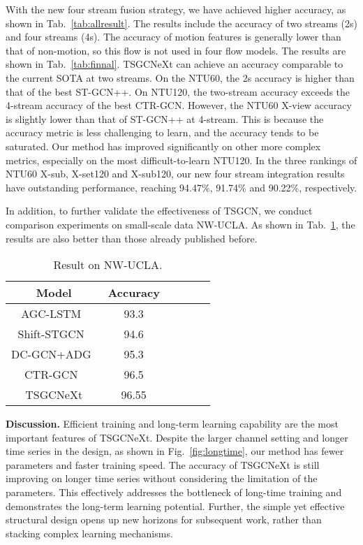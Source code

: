 \documentclass[10pt,twocolumn,letterpaper]{article}
\begin{document}
With the new four stream fusion strategy, we have achieved higher accuracy, as shown in Tab.~\ref{tab:allresult}. The results include the accuracy of two streams (2s) and four streams (4s). The accuracy of motion features is generally lower than that of non-motion, so this flow is not used in four flow models. The results are shown in Tab.~\ref{tab:finnal}. TSGCNeXt can achieve an accuracy comparable to the current SOTA at two streams. On the NTU60, the 2s accuracy is higher than that of the best ST-GCN++. On NTU120, the two-stream accuracy exceeds the 4-stream accuracy of the best CTR-GCN. However, the NTU60 X-view accuracy is slightly lower than that of ST-GCN++ at 4-stream. This is because the accuracy metric is less challenging to learn, and the accuracy tends to be saturated. Our method has improved significantly on other more complex metrics, especially on the most difficult-to-learn NTU120. In the three rankings of NTU60 X-sub, X-set120 and X-sub120, our new four stream integration results have outstanding performance, reaching 94.47\%, 91.74\% and 90.22\%, respectively.

In addition, to further validate the effectiveness of TSGCN, we conduct comparison experiments on small-scale data NW-UCLA. As shown in Tab.~\ref{tab:NW}, the results are also better than those already published before.
\begin{table}[htp]
  \centering
  \setlength{\abovecaptionskip}{0pt}
  \caption{Result on NW-UCLA.}
  \setlength{\belowcaptionskip}{0pt}
    \begin{tabular}{cccccc}
    \toprule Model &Accuracy\\
    \midrule AGC-LSTM~\cite{si2019attention}    & 93.3\\
    Shift-STGCN~\cite{cheng2020skeleton}     & 94.6\\
    DC-GCN+ADG~\cite{cheng2020decoupling}   & 95.3\\
    CTR-GCN~\cite{chen2021channel}     & 96.5\\
    \midrule
    TSGCNeXt  & 96.55\\
    \bottomrule \end{tabular}\label{tab:NW}\vspace{-1em}
\end{table}


\noindent\textbf{Discussion.} Efficient training and long-term learning capability are the most important features of TSGCNeXt. Despite the larger channel setting and longer time series in the design, as shown in Fig.~\ref{fig:longtime}, our method has fewer parameters and faster training speed. The accuracy of TSGCNeXt is still improving on longer time series without considering the limitation of the parameters. This effectively addresses the bottleneck of long-time training and demonstrates the long-term learning potential. Further, the simple yet effective structural design opens up new horizons for subsequent work, rather than stacking complex learning mechanisms.
\end{document}
